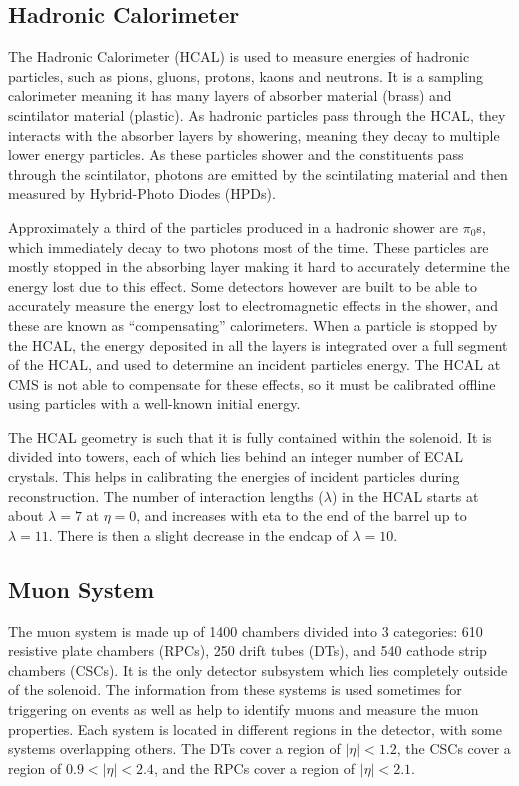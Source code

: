\subsection{Hadronic Calorimeter}
\label {subs:HCAL}
The Hadronic Calorimeter (HCAL) is used to measure energies of hadronic particles, such as pions, gluons, protons, kaons and neutrons.
It is a sampling calorimeter meaning it has many layers of absorber material (brass) and scintilator material (plastic).
As hadronic particles pass through the HCAL, they interacts with the absorber layers by showering, meaning they decay to multiple lower energy particles.
As these particles shower and the constituents pass through the scintilator, photons are emitted by the scintilating material and then measured by Hybrid-Photo Diodes (HPDs).

Approximately a third of the particles produced in a hadronic shower are $\pi_{0}$s, which immediately decay to two photons most of the time.
These particles are mostly stopped in the absorbing layer making it hard to accurately determine the energy lost due to this effect.
Some detectors however are built to be able to accurately measure the energy lost to electromagnetic effects in the shower, and these are known as ``compensating'' calorimeters.
When a particle is stopped by the HCAL, the energy deposited in all the layers is integrated over a full segment of the HCAL, and used to determine an incident particles energy.
The HCAL at CMS is not able to compensate for these effects, so it must be calibrated offline using particles with a well-known initial energy.

The HCAL geometry is such that it is fully contained within the solenoid.
It is divided into towers, each of which lies behind an integer number of ECAL crystals.
This helps in calibrating the energies of incident particles during reconstruction.
The number of interaction lengths ($\lambda$) in the HCAL starts at about $\lambda = 7$ at $\eta = 0$, and increases with eta to the end of the barrel up to $\lambda = 11$.
There is then a slight decrease in the endcap of $\lambda = 10$.

\subsection{Muon System}
\label {subs:MUON}
The muon system is made up of 1400 chambers divided into 3 categories: 610 resistive plate chambers (RPCs), 250 drift tubes (DTs), and 540 cathode strip chambers (CSCs).
It is the only detector subsystem which lies completely outside of the solenoid.
The information from these systems is used sometimes for triggering on events as well as help to identify muons and measure the muon properties.
Each system is located in different regions in the detector, with some systems overlapping others.
The DTs cover a region of $|\eta| < 1.2$, the CSCs cover a region of $0.9 < |\eta| < 2.4$, and the RPCs cover a region of $|\eta| < 2.1$.

